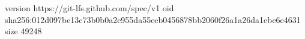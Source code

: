 version https://git-lfs.github.com/spec/v1
oid sha256:012d097be13c73b0b0a2c955da55eeb0456878bb2060f26a1a26da1ebe6e4631
size 49248
